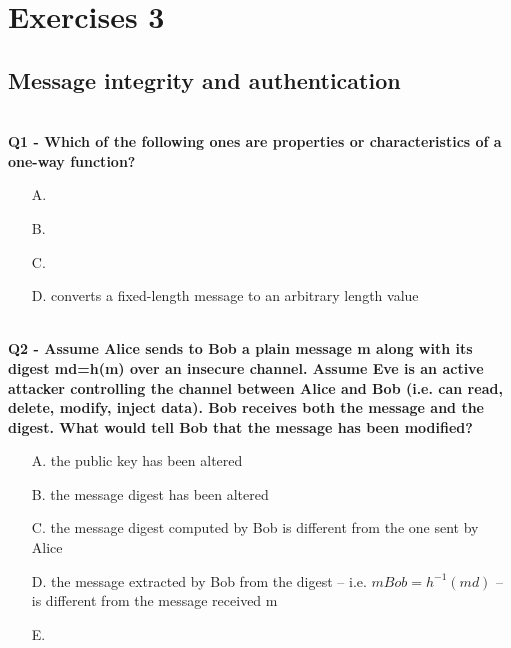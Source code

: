 \chapter{Exercises 3}

\section{Message integrity and authentication}

\textbf{\\Q1 - Which of the following ones are properties or characteristics of a one-way function?}
\begin{enumerate}
    \item[A.] 
    \item[B.] 
    \item[C.] 
    \item[D.] converts a fixed-length message to an arbitrary length value
\end{enumerate}

\textbf{\\Q2 - Assume Alice sends to Bob a plain message m along with its digest md=h(m) over an insecure channel. Assume Eve is an active attacker controlling the channel between Alice and Bob (i.e. can read, delete, modify, inject data). Bob receives both the message and the digest. What would tell Bob that the message has been modified?}
\begin{enumerate}
    \item[A.] the public key has been altered
    \item[B.] the message digest has been altered
    \item[C.] the message digest computed by Bob is different from the one sent by Alice
    \item[D.] the message extracted by Bob from the digest – i.e. $mBob=h^{-1}(md)$ – is different from the message received m
    \item[E.] 
\end{enumerate}


